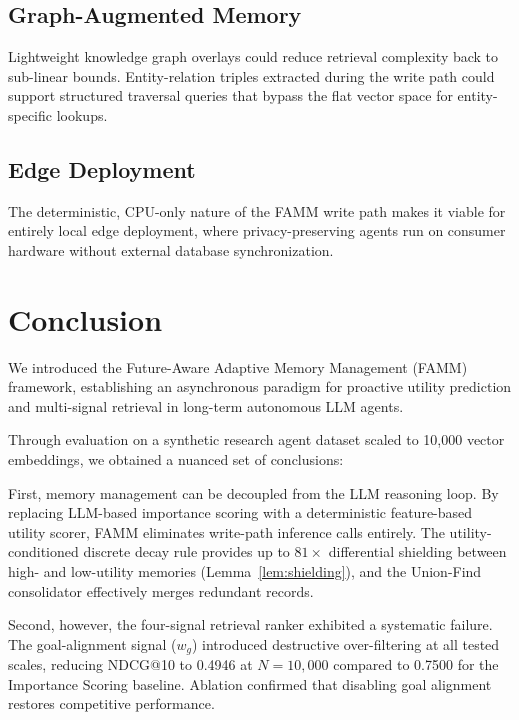 \documentclass[conference]{IEEEtran}
\begin{document}
\subsection{Graph-Augmented Memory}
Lightweight knowledge graph overlays \cite{edge2024graphrag} could reduce retrieval complexity back to sub-linear bounds. Entity-relation triples extracted during the write path could support structured traversal queries that bypass the flat vector space for entity-specific lookups.

\subsection{Edge Deployment}
The deterministic, CPU-only nature of the FAMM write path makes it viable for entirely local edge deployment, where privacy-preserving agents run on consumer hardware without external database synchronization.

\section{Conclusion}
\label{sec:conclusion}

We introduced the Future-Aware Adaptive Memory Management (FAMM) framework, establishing an asynchronous paradigm for proactive utility prediction and multi-signal retrieval in long-term autonomous LLM agents.

Through evaluation on a synthetic research agent dataset scaled to 10,000 vector embeddings, we obtained a nuanced set of conclusions:

First, memory management can be decoupled from the LLM reasoning loop. By replacing LLM-based importance scoring with a deterministic feature-based utility scorer, FAMM eliminates write-path inference calls entirely. The utility-conditioned discrete decay rule provides up to $81\times$ differential shielding between high- and low-utility memories (Lemma~\ref{lem:shielding}), and the Union-Find consolidator effectively merges redundant records.

Second, however, the four-signal retrieval ranker exhibited a systematic failure. The goal-alignment signal ($w_g$) introduced destructive over-filtering at all tested scales, reducing NDCG@10 to 0.4946 at $N{=}10{,}000$ compared to 0.7500 for the Importance Scoring baseline. Ablation confirmed that disabling goal alignment restores competitive performance.
\end{document}
